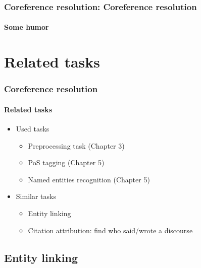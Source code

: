 \documentclass[xcolor=table]{beamer}
\begin{document}
\begin{frame}
	\frametitle{Coreference resolution: Coreference resolution}
	\framesubtitle{Some humor}
	
	\begin{center}
	\end{center}
	
\end{frame}

\section{Related tasks}

\begin{frame}
	\frametitle{Coreference resolution}
	\framesubtitle{Related tasks}
	
	\begin{itemize}
		\item Used tasks
		\begin{itemize}
			\item Preprocessing task (Chapter 3)
			\item PoS tagging (Chapter 5)
			\item Named entities recognition (Chapter 5)
		\end{itemize}
		\item Similar tasks
		\begin{itemize}
			\item Entity linking
			\item Citation attribution: find who said/wrote a discourse
		\end{itemize}
	\end{itemize}
	
\end{frame}

\subsection{Entity linking}
\end{document}
